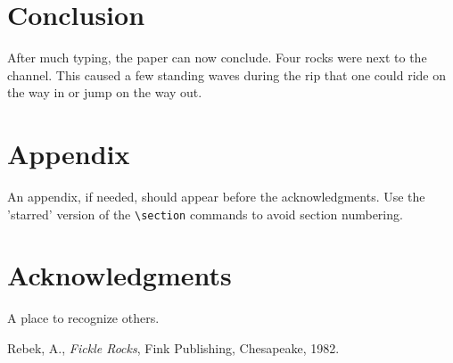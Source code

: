 \documentclass[]{aiaa-tc}%
\begin{document}
\section{Conclusion}

After much typing, the paper can now conclude.
Four rocks were next to the channel.
This caused a few standing waves during the rip that one could ride on
the way in or jump on the way out.

\section*{Appendix}

An appendix, if needed, should appear before the acknowledgments.
Use the 'starred' version of the \verb|\section| commands to avoid
section numbering.

\section*{Acknowledgments}

A place to recognize others.

\begin{thebibliography}{9}%
 Rebek, A., {\it Fickle Rocks}, Fink Publishing, Chesapeake, 1982.
\end{thebibliography}
\end{document}
